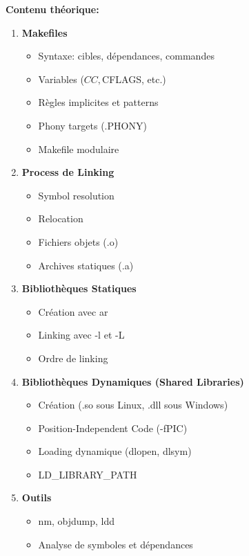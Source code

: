 \documentclass[10pt,a4paper]{article}
\begin{document}
\textbf{Contenu théorique:}
\begin{enumerate}
\item \textbf{Makefiles}
   \begin{itemize}
   \item Syntaxe: cibles, dépendances, commandes
   \item Variables ($CC, $CFLAGS, etc.)
   \item Règles implicites et patterns
   \item Phony targets (.PHONY)
   \item Makefile modulaire
   \end{itemize}

\item \textbf{Process de Linking}
   \begin{itemize}
   \item Symbol resolution
   \item Relocation
   \item Fichiers objets (.o)
   \item Archives statiques (.a)
   \end{itemize}

\item \textbf{Bibliothèques Statiques}
   \begin{itemize}
   \item Création avec ar
   \item Linking avec -l et -L
   \item Ordre de linking
   \end{itemize}

\item \textbf{Bibliothèques Dynamiques (Shared Libraries)}
   \begin{itemize}
   \item Création (.so sous Linux, .dll sous Windows)
   \item Position-Independent Code (-fPIC)
   \item Loading dynamique (dlopen, dlsym)
   \item LD\_LIBRARY\_PATH
   \end{itemize}

\item \textbf{Outils}
   \begin{itemize}
   \item nm, objdump, ldd
   \item Analyse de symboles et dépendances
   \end{itemize}
\end{enumerate}
\end{document}

